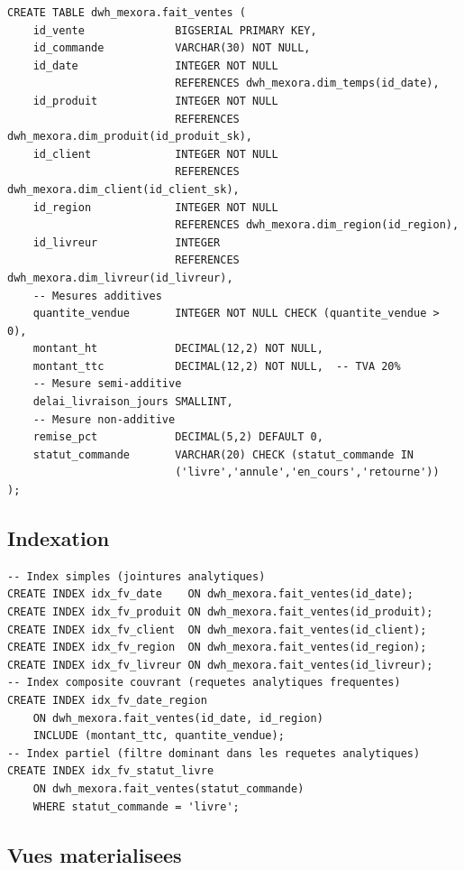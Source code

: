 \documentclass[12pt,a4paper]{article}
\begin{document}
\begin{lstlisting}[style=sql, caption=FAIT\_VENTES avec contraintes CHECK et FK]
CREATE TABLE dwh_mexora.fait_ventes (
    id_vente              BIGSERIAL PRIMARY KEY,
    id_commande           VARCHAR(30) NOT NULL,
    id_date               INTEGER NOT NULL
                          REFERENCES dwh_mexora.dim_temps(id_date),
    id_produit            INTEGER NOT NULL
                          REFERENCES dwh_mexora.dim_produit(id_produit_sk),
    id_client             INTEGER NOT NULL
                          REFERENCES dwh_mexora.dim_client(id_client_sk),
    id_region             INTEGER NOT NULL
                          REFERENCES dwh_mexora.dim_region(id_region),
    id_livreur            INTEGER
                          REFERENCES dwh_mexora.dim_livreur(id_livreur),
    -- Mesures additives
    quantite_vendue       INTEGER NOT NULL CHECK (quantite_vendue > 0),
    montant_ht            DECIMAL(12,2) NOT NULL,
    montant_ttc           DECIMAL(12,2) NOT NULL,  -- TVA 20%
    -- Mesure semi-additive
    delai_livraison_jours SMALLINT,
    -- Mesure non-additive
    remise_pct            DECIMAL(5,2) DEFAULT 0,
    statut_commande       VARCHAR(20) CHECK (statut_commande IN
                          ('livre','annule','en_cours','retourne'))
);
\end{lstlisting}

\subsection{Indexation}

\begin{lstlisting}[style=sql, caption=Index simples et composites sur FAIT\_VENTES]
-- Index simples (jointures analytiques)
CREATE INDEX idx_fv_date    ON dwh_mexora.fait_ventes(id_date);
CREATE INDEX idx_fv_produit ON dwh_mexora.fait_ventes(id_produit);
CREATE INDEX idx_fv_client  ON dwh_mexora.fait_ventes(id_client);
CREATE INDEX idx_fv_region  ON dwh_mexora.fait_ventes(id_region);
CREATE INDEX idx_fv_livreur ON dwh_mexora.fait_ventes(id_livreur);
-- Index composite couvrant (requetes analytiques frequentes)
CREATE INDEX idx_fv_date_region
    ON dwh_mexora.fait_ventes(id_date, id_region)
    INCLUDE (montant_ttc, quantite_vendue);
-- Index partiel (filtre dominant dans les requetes analytiques)
CREATE INDEX idx_fv_statut_livre
    ON dwh_mexora.fait_ventes(statut_commande)
    WHERE statut_commande = 'livre';
\end{lstlisting}

\subsection{Vues materialisees}
\end{document}
